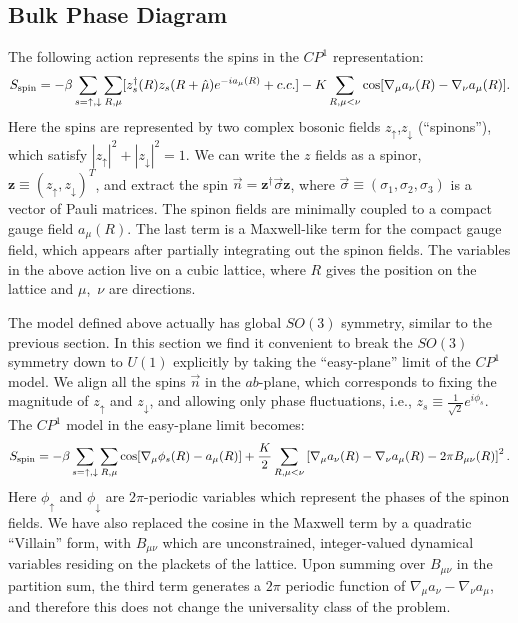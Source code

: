 \subsection{Bulk Phase Diagram}
The following action represents the spins in the $CP^1$ representation:
\begin{eqnarray}
S_{\rm spin}=-\beta\sum_{s=\uparrow,\downarrow}\sum_{R,\mu} [z_s^\dagger(R)z_s(R+\hat\mu)e^{-ia_\mu(R)}+c.c.] 
-K\sum_{R,\mu<\nu} \cos[\nabla_\mu a_\nu(R)-\nabla_\nu a_\mu(R)].
\label{cp1action}
\end{eqnarray} 
Here the spins are represented by two complex bosonic fields $z_\uparrow$,$z_\downarrow$ (``spinons''), which satisfy $|z_\uparrow|^2+|z_\downarrow|^2=1$. We can write the $z$ fields as a spinor, $\mathbf{z}\equiv(z_\uparrow,z_\downarrow)^T$, and extract the spin $\vec{n}=\mathbf{z^\dagger} \vec\sigma \mathbf{z}$, where $\vec{\sigma}\equiv (\sigma_1,\sigma_2,\sigma_3)$ is a vector of Pauli matrices.
The spinon fields are minimally coupled to a compact gauge field $a_\mu(R)$. The last term is a Maxwell-like term for the compact gauge field, which appears after partially integrating out the spinon fields. The variables in the above action live on a cubic lattice, where $R$ gives the position on the lattice and $\mu$,~$\nu$ are directions.

The \cp model defined above actually has global $SO(3)$ symmetry, similar to the previous section. In this section we find it convenient to break the $SO(3)$ symmetry down to $U(1)$ explicitly by taking the ``easy-plane'' limit of the $CP^1$ model. We align all the spins $\vec{n}$ in the $ab$-plane, which corresponds to fixing the magnitude of $z_\uparrow$ and $z_\downarrow$, and allowing only phase fluctuations, i.e., $z_s\equiv \frac{1}{\sqrt{2}}e^{i\phi_s}$. The $CP^1$ model in the easy-plane limit becomes:
\begin{eqnarray}
S_{\rm spin}=-\beta\sum_{s=\uparrow,\downarrow}\sum_{R,\mu} \cos[\nabla_\mu\phi_s(R)-a_\mu(R)]
+\frac{K}{2}\sum_{R,\mu<\nu}\left[\nabla_\mu a_\nu(R)-\nabla_\nu a_\mu(R)-2\pi B_{\mu\nu}(R)\right]^2.
\label{sspin}
\end{eqnarray}
Here $\phi_\uparrow$ and $\phi_\downarrow$ are $2\pi$-periodic variables which represent the phases of the spinon fields. We have also replaced the cosine in the Maxwell term by a quadratic ``Villain'' form, with $B_{\mu\nu}$ which are unconstrained, integer-valued dynamical variables residing on the plackets of the lattice. Upon summing over $B_{\mu\nu}$ in the partition sum, the third term generates a $2\pi$ periodic function of $\nabla_\mu a_{\nu}-\nabla_\nu a_{\mu}$, and therefore this does not change the universality class of the problem.

